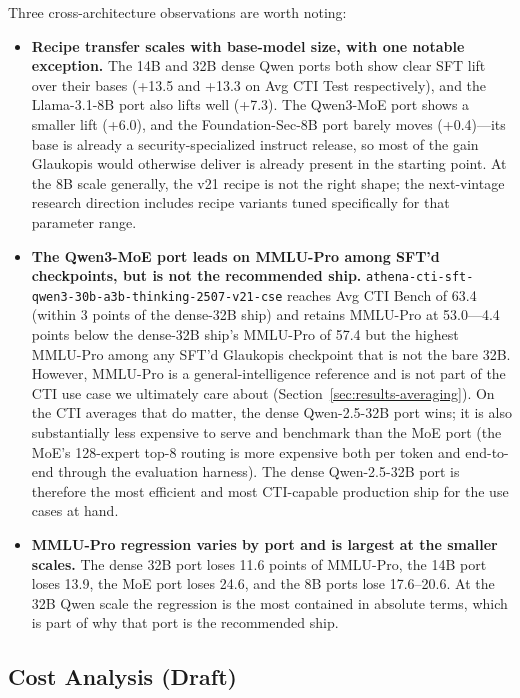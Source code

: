 \documentclass[unnumsec,webpdf,contemporary,large]{oup-authoring-template}
\theoremstyle{thmstyleone}
\theoremstyle{thmstyletwo}
\theoremstyle{thmstylethree}
\begin{document}
Three cross-architecture observations are worth noting:

\begin{itemize}
  \item \textbf{Recipe transfer scales with base-model size, with one notable exception.} The 14B and 32B dense Qwen ports both show clear SFT lift over their bases (+13.5 and +13.3 on Avg CTI Test respectively), and the Llama-3.1-8B port also lifts well (+7.3). The Qwen3-MoE port shows a smaller lift (+6.0), and the Foundation-Sec-8B port barely moves (+0.4)---its base is already a security-specialized instruct release, so most of the gain Glaukopis would otherwise deliver is already present in the starting point. At the 8B scale generally, the v21 recipe is not the right shape; the next-vintage research direction includes recipe variants tuned specifically for that parameter range.
  \item \textbf{The Qwen3-MoE port leads on MMLU-Pro among SFT'd checkpoints, but is not the recommended ship.} \texttt{athena-cti-sft-qwen3-30b-a3b-thinking-2507-v21-cse} reaches Avg CTI Bench of 63.4 (within 3 points of the dense-32B ship) and retains MMLU-Pro at 53.0---4.4 points below the dense-32B ship's MMLU-Pro of 57.4 but the highest MMLU-Pro among any SFT'd Glaukopis checkpoint that is not the bare 32B. However, MMLU-Pro is a general-intelligence reference and is not part of the CTI use case we ultimately care about (Section~\ref{sec:results-averaging}). On the CTI averages that do matter, the dense Qwen-2.5-32B port wins; it is also substantially less expensive to serve and benchmark than the MoE port (the MoE's 128-expert top-8 routing is more expensive both per token and end-to-end through the evaluation harness). The dense Qwen-2.5-32B port is therefore the most efficient and most CTI-capable production ship for the use cases at hand.
  \item \textbf{MMLU-Pro regression varies by port and is largest at the smaller scales.} The dense 32B port loses 11.6 points of MMLU-Pro, the 14B port loses 13.9, the MoE port loses 24.6, and the 8B ports lose 17.6--20.6. At the 32B Qwen scale the regression is the most contained in absolute terms, which is part of why that port is the recommended ship.
\end{itemize}

\subsection{Cost Analysis (Draft)}
\label{sec:results-cost}
\end{document}

